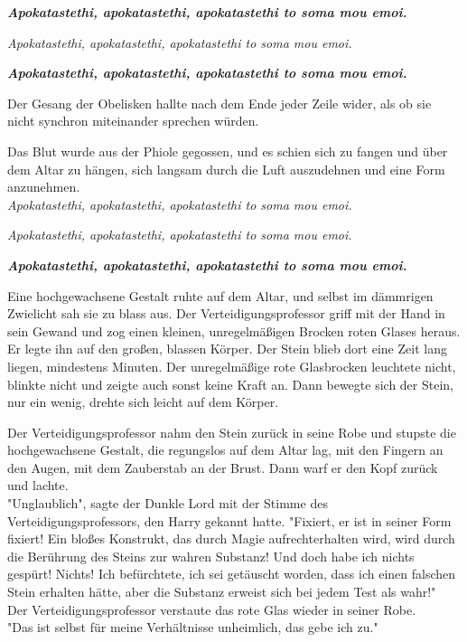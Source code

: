 {\textbf{\emph{\hfill\break Apokatastethi, apokatastethi, apokatastethi to soma mou emoi.}}

\emph{Apokatastethi, apokatastethi, apokatastethi to soma mou emoi.}

\textbf{\emph{Apokatastethi, apokatastethi, apokatastethi to soma mou emoi.}}

Der Gesang der Obelisken hallte nach dem Ende jeder Zeile wider, als ob sie nicht synchron miteinander sprechen würden.

Das Blut wurde aus der Phiole gegossen, und es schien sich zu fangen und über dem Altar zu hängen, sich langsam durch die Luft auszudehnen und eine Form anzunehmen.\\

\emph{Apokatastethi, apokatastethi, apokatastethi to soma mou emoi.}

\emph{Apokatastethi, apokatastethi, apokatastethi to soma mou emoi.}

\textbf{\emph{Apokatastethi, apokatastethi, apokatastethi to soma mou emoi.}}

Eine hochgewachsene Gestalt ruhte auf dem Altar, und selbst im dämmrigen Zwielicht sah sie zu blass aus. Der Verteidigungsprofessor griff mit der Hand in sein Gewand und zog einen kleinen, unregelmäßigen Brocken roten Glases heraus.\\ Er legte ihn auf den großen, blassen Körper. Der Stein blieb dort eine Zeit lang liegen, mindestens Minuten. Der unregelmäßige rote Glasbrocken leuchtete nicht, blinkte nicht und zeigte auch sonst keine Kraft an. Dann bewegte sich der Stein, nur ein wenig, drehte sich leicht auf dem Körper.

Der Verteidigungsprofessor nahm den Stein zurück in seine Robe und stupste die hochgewachsene Gestalt, die regungslos auf dem Altar lag, mit den Fingern an den Augen, mit dem Zauberstab an der Brust. Dann warf er den Kopf zurück und lachte.\\ "Unglaublich", sagte der Dunkle Lord mit der Stimme des Verteidigungsprofessors, den Harry gekannt hatte. "Fixiert, er ist in seiner Form fixiert! Ein bloßes Konstrukt, das durch Magie aufrechterhalten wird, wird durch die Berührung des Steins zur wahren Substanz! Und doch habe ich nichts gespürt! Nichts! Ich befürchtete, ich sei getäuscht worden, dass ich einen falschen Stein erhalten hätte, aber die Substanz erweist sich bei jedem Test als wahr!"\\ Der Verteidigungsprofessor verstaute das rote Glas wieder in seiner Robe.\\ "Das ist selbst für meine Verhältnisse unheimlich, das gebe ich zu."

}
